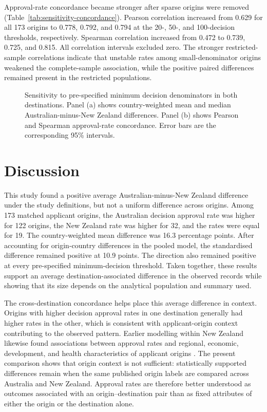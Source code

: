 \documentclass[runningheads]{llncs}
\begin{document}


Approval-rate concordance became stronger after sparse origins were removed (Table~\ref{tab:sensitivity-concordance}). Pearson correlation increased from 0.629 for all 173 origins to 0.778, 0.792, and 0.794 at the 20-, 50-, and 100-decision thresholds, respectively. Spearman correlation increased from 0.472 to 0.739, 0.725, and 0.815. All correlation intervals excluded zero. The stronger restricted-sample correlations indicate that unstable rates among small-denominator origins weakened the complete-sample association, while the positive paired differences remained present in the restricted populations.

\begin{figure}
\centering

\caption{Sensitivity to pre-specified minimum decision denominators in both destinations. Panel (a) shows country-weighted mean and median Australian-minus-New Zealand differences. Panel (b) shows Pearson and Spearman approval-rate concordance. Error bars are the corresponding 95\% intervals.}
\label{fig:threshold-sensitivity}
\end{figure}

\section{Discussion}

This study found a positive average Australian-minus-New Zealand difference under the study definitions, but not a uniform difference across origins. Among 173 matched applicant origins, the Australian decision approval rate was higher for 122 origins, the New Zealand rate was higher for 32, and the rates were equal for 19. The country-weighted mean difference was 16.3 percentage points. After accounting for origin-country differences in the pooled model, the standardised difference remained positive at 10.9 points. The direction also remained positive at every pre-specified minimum-decision threshold. Taken together, these results support an average destination-associated difference in the observed records while showing that its size depends on the analytical population and summary used.

The cross-destination concordance helps place this average difference in context. Origins with higher decision approval rates in one destination generally had higher rates in the other, which is consistent with applicant-origin context contributing to the observed pattern. Earlier modelling within New Zealand likewise found associations between approval rates and regional, economic, development, and health characteristics of applicant origins \cite{Kaplan2026NZVisaApproval}. The present comparison shows that origin context is not sufficient: statistically supported differences remain when the same published origin labels are compared across Australia and New Zealand. Approval rates are therefore better understood as outcomes associated with an origin--destination pair than as fixed attributes of either the origin or the destination alone.
\end{document}
